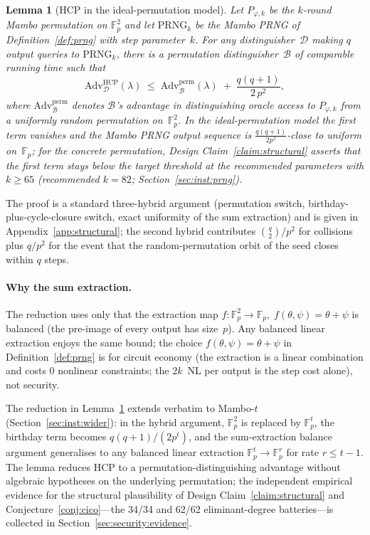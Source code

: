 \documentclass[11pt,a4paper]{article}
\newtheorem{lemma}[theorem]{Lemma}
\theoremstyle{definition}
\newcommand{\Fp}{\mathbb{F}_p}
\begin{document}
\begin{lemma}[HCP in the ideal-permutation model]\label{lem:hcp_from_prp}
Let $P_{\varphi,k}$ be the $k$-round Mambo permutation on $\Fp^2$ and
let $\mathrm{PRNG}_k$ be the Mambo PRNG of Definition~\ref{def:prng}
with step parameter~$k$. For any distinguisher~$\mathcal{D}$ making
$q$ output queries to $\mathrm{PRNG}_k$, there is a
permutation distinguisher~$\mathcal{B}$ of comparable running time
such that
\[
  \mathrm{Adv}^{\mathrm{HCP}}_{\mathcal{D}}(\lambda)
  \;\le\;
  \mathrm{Adv}^{\mathrm{perm}}_{\mathcal{B}}(\lambda)
  \;+\;
  \frac{q(q+1)}{2\,p^{2}},
\]
where $\mathrm{Adv}^{\mathrm{perm}}_{\mathcal{B}}$ denotes
$\mathcal{B}$'s advantage in distinguishing oracle access to
$P_{\varphi,k}$ from a uniformly random permutation on~$\Fp^2$. In
the ideal-permutation model the first term vanishes and the Mambo
PRNG output sequence is $\tfrac{q(q+1)}{2p^2}$-close to uniform
on~$\Fp$; for the concrete permutation, Design
Claim~\ref{claim:structural} asserts that the first term stays below
the target threshold at the recommended parameters with $k \ge 65$
(recommended $k = 82$; Section~\ref{sec:inst:prng}).
\end{lemma}

The proof is a standard three-hybrid argument (permutation switch,
birthday-plus-cycle-closure switch, exact uniformity of the sum
extraction) and is given in Appendix~\ref{app:structural}; the
second hybrid contributes $\binom{q}{2}/p^2$ for collisions plus
$q/p^2$ for the event that the random-permutation orbit of the seed
closes within $q$ steps.

\paragraph{Why the sum extraction.}
The reduction uses only that the extraction map
$f\!:\!\Fp^{2}\!\to\!\Fp,\;f(\theta,\psi)=\theta+\psi$ is balanced
(the pre-image of every output has size~$p$). Any balanced linear
extraction enjoys the same bound; the choice $f(\theta,\psi)=
\theta+\psi$ in Definition~\ref{def:prng} is for circuit economy
(the extraction is a linear combination and costs $0$ nonlinear
constraints; the $2k$~NL per output is the step cost alone), not
security.

The reduction in Lemma~\ref{lem:hcp_from_prp} extends verbatim to
Mambo-$t$ (Section~\ref{sec:inst:wider}): in the hybrid argument,
$\Fp^{2}$ is replaced by $\Fp^{t}$, the birthday term becomes
$q(q+1)/(2p^{t})$, and the sum-extraction balance argument
generalises to any balanced linear extraction $\Fp^{t}\to\Fp^{r}$
for rate $r\le t-1$. The lemma reduces HCP to a
permutation-distinguishing advantage without algebraic hypotheses on
the underlying permutation; the independent empirical evidence for
the structural plausibility of Design Claim~\ref{claim:structural}
and Conjecture~\ref{conj:cico}---the 34/34 and 62/62
eliminant-degree batteries---is collected in
Section~\ref{sec:security:evidence}.
\end{document}
